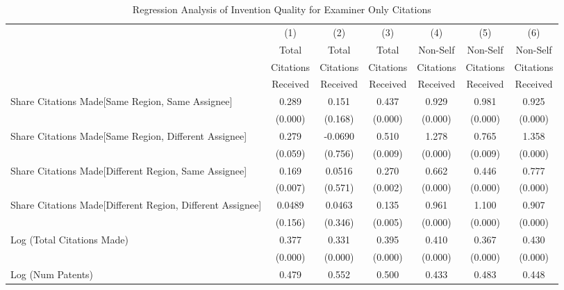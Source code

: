 \documentclass[12pt,letterpaper]{article}
\begin{document}
\begin{table}[htbp]\centering \caption{Regression Analysis of Invention Quality for Examiner Only Citations \label{e.model123192021}}
\scriptsize
\singlespacing
\begin{tabular}{l*{6}{c}} \hline
                &\multicolumn{1}{c}{(1)}&\multicolumn{1}{c}{(2)}&\multicolumn{1}{c}{(3)}&\multicolumn{1}{c}{(4)}&\multicolumn{1}{c}{(5)}&\multicolumn{1}{c}{(6)}\\
                &\multicolumn{1}{c}{Total}&\multicolumn{1}{c}{Total}&\multicolumn{1}{c}{Total}&\multicolumn{1}{c}{Non-Self}&\multicolumn{1}{c}{Non-Self}&\multicolumn{1}{c}{Non-Self}\\
                &\multicolumn{1}{c}{Citations}&\multicolumn{1}{c}{Citations}&\multicolumn{1}{c}{Citations}&\multicolumn{1}{c}{Citations}&\multicolumn{1}{c}{Citations}&\multicolumn{1}{c}{Citations}\\
                 &\multicolumn{1}{c}{Received}&\multicolumn{1}{c}{Received}&\multicolumn{1}{c}{Received}&\multicolumn{1}{c}{Received}&\multicolumn{1}{c}{Received}&\multicolumn{1}{c}{Received}\\
\hline
Share Citations Made[Same Region, Same Assignee]&    0.289&    0.151&    0.437&    0.929&    0.981&    0.925\\
                &  (0.000)&  (0.168)&  (0.000)&  (0.000)&  (0.000)&  (0.000)\\
Share Citations Made[Same Region, Different Assignee]&    0.279&  -0.0690&    0.510&    1.278&    0.765&    1.358\\
                &  (0.059)&  (0.756)&  (0.009)&  (0.000)&  (0.009)&  (0.000)\\
Share Citations Made[Different Region, Same Assignee]&    0.169&   0.0516&    0.270&    0.662&    0.446&    0.777\\
                &  (0.007)&  (0.571)&  (0.002)&  (0.000)&  (0.000)&  (0.000)\\
Share Citations Made[Different Region, Different Assignee]&   0.0489&   0.0463&    0.135&    0.961&    1.100&    0.907\\
                &  (0.156)&  (0.346)&  (0.005)&  (0.000)&  (0.000)&  (0.000)\\
Log (Total Citations Made)&    0.377&    0.331&    0.395&    0.410&    0.367&    0.430\\
                &  (0.000)&  (0.000)&  (0.000)&  (0.000)&  (0.000)&  (0.000)\\
Log (Num Patents)&    0.479&    0.552&    0.500&    0.433&    0.483&    0.448\\

\end{tabular}
\end{table}
\end{document}
